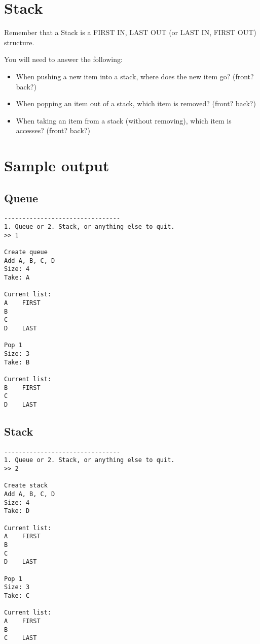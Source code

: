 \documentclass[a4paper,12pt,oneside]{book}
\begin{document}
    \section{Stack}

    Remember that a Stack is a FIRST IN, LAST OUT (or LAST IN, FIRST OUT) structure.

    You will need to answer the following:

    \begin{itemize}
        \item   When pushing a new item into a stack, where does the new item go? (front? back?)
        \item   When popping an item out of a stack, which item is removed? (front? back?)
        \item   When taking an item from a stack (without removing), which item is accesses? (front? back?)
    \end{itemize}

    \newpage{}
    
    \section{Sample output}

    \subsection{Queue}

\begin{lstlisting}[style=output]
--------------------------------
1. Queue or 2. Stack, or anything else to quit.
>> 1

Create queue
Add A, B, C, D
Size: 4
Take: A

Current list:
A	 FIRST
B
C
D	 LAST

Pop 1
Size: 3
Take: B

Current list:
B	 FIRST
C
D	 LAST
\end{lstlisting}

    \newpage
    \subsection{Stack}
    
    
\begin{lstlisting}[style=output]
--------------------------------
1. Queue or 2. Stack, or anything else to quit.
>> 2

Create stack
Add A, B, C, D
Size: 4
Take: D

Current list:
A	 FIRST
B
C
D	 LAST

Pop 1
Size: 3
Take: C

Current list:
A	 FIRST
B
C	 LAST
\end{lstlisting}
\end{document}
